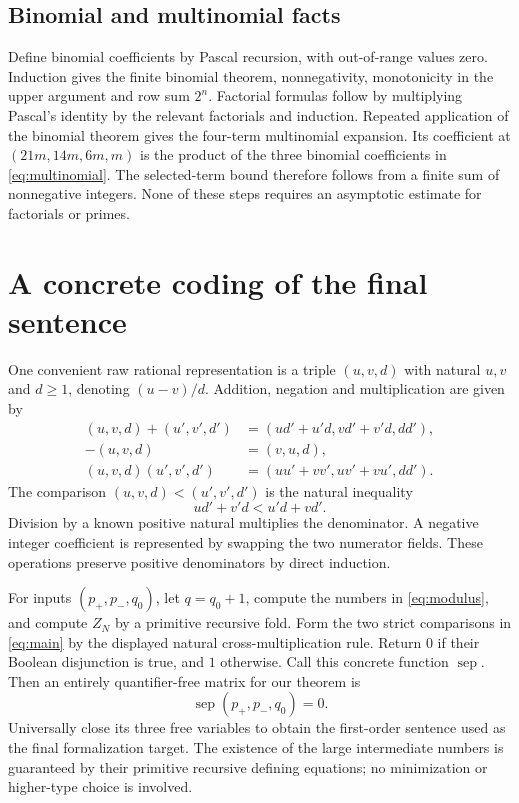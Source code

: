\documentclass[11pt]{article}
\theoremstyle{definition}\newtheorem{definition}[theorem]{Definition}
\theoremstyle{remark}\newtheorem{remark}[theorem]{Remark}
\begin{document}
\subsection{Binomial and multinomial facts}
Define binomial coefficients by Pascal recursion, with out-of-range values
zero. Induction gives the finite binomial theorem, nonnegativity,
monotonicity in the upper argument and row sum $2^n$.
Factorial formulas follow by multiplying Pascal's identity by the relevant
factorials and induction. Repeated application of the binomial theorem
gives the four-term multinomial expansion. Its coefficient at
$(21m,14m,6m,m)$ is the product of the three binomial coefficients in
\eqref{eq:multinomial}. The selected-term bound therefore follows from a
finite sum of nonnegative integers. None of these steps requires an
asymptotic estimate for factorials or primes.

\section{A concrete coding of the final sentence}\label{app:coding}
One convenient raw rational representation is a triple
$(u,v,d)$ with natural $u,v$ and $d\ge1$, denoting $(u-v)/d$.
Addition, negation and multiplication are given by
\begin{align*}
 (u,v,d)+(u',v',d')&=(ud'+u'd,vd'+v'd,dd'),\\
 -(u,v,d)&=(v,u,d),\\
 (u,v,d)(u',v',d')&=(uu'+vv',uv'+vu',dd').
\end{align*}
The comparison $(u,v,d)<(u',v',d')$ is the natural inequality
\[
 ud'+v'd<u'd+vd'.
\]
Division by a known positive natural multiplies the denominator. A negative
integer coefficient is represented by swapping the two numerator fields.
These operations preserve positive denominators by direct induction.

For inputs $(p_+,p_-,q_0)$, let $q=q_0+1$, compute the numbers in
\eqref{eq:modulus}, and compute $Z_N$ by a primitive recursive fold. Form
the two strict comparisons in \eqref{eq:main} by the displayed natural
cross-multiplication rule. Return $0$ if their Boolean disjunction is true,
and $1$ otherwise. Call this concrete function $\operatorname{sep}$.
Then an entirely quantifier-free matrix for our theorem is
\[
 \operatorname{sep}(p_+,p_-,q_0)=0.
\]
Universally close its three free variables to obtain the first-order
sentence used as the final formalization target. The existence of the
large intermediate numbers is guaranteed by their primitive recursive
defining equations; no minimization or higher-type choice is involved.
\end{document}
